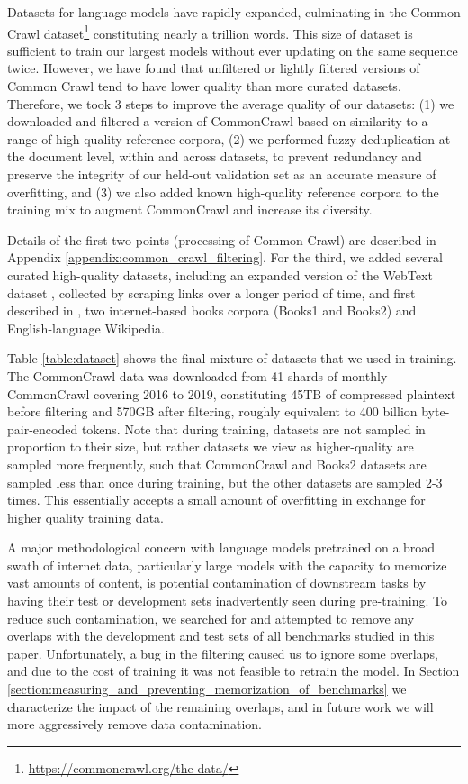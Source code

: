 Datasets for language models have rapidly expanded, culminating in the Common Crawl dataset\footnote{\url{https://commoncrawl.org/the-data/}} \cite{raffel2019t5} constituting nearly a trillion words.  This size of dataset is sufficient to train our largest models without ever updating on the same sequence twice. However, we have found that unfiltered or lightly filtered versions of Common Crawl tend to have lower quality than more curated datasets.  Therefore, we took 3 steps to improve the average quality of our datasets: (1) we downloaded and filtered a version of CommonCrawl based on similarity to a range of high-quality reference corpora, (2) we performed fuzzy deduplication at the document level, within and across datasets, to prevent redundancy and preserve the integrity of our held-out validation set as an accurate measure of overfitting, and (3) we also added known high-quality reference corpora to the training mix to augment CommonCrawl and increase its diversity.

Details of the first two points (processing of Common Crawl) are described in Appendix \ref{appendix:common_crawl_filtering}. For the third, we added several curated high-quality datasets, including an expanded version of the WebText dataset \cite{radford2019language}, collected by scraping links over a longer period of time, and first described in \cite{kaplan2020scaling}, two internet-based books corpora (Books1 and Books2) and English-language Wikipedia.


Table \ref{table:dataset} shows the final mixture of datasets that we used in training.  The CommonCrawl data was downloaded from 41 shards of monthly CommonCrawl covering 2016 to 2019, constituting 45TB of compressed plaintext before filtering and 570GB after filtering, roughly equivalent to 400 billion byte-pair-encoded tokens.    Note that during training, datasets are not sampled in proportion to their size, but rather datasets we view as higher-quality are sampled more frequently, such that CommonCrawl and Books2 datasets are sampled less than once during training, but the other datasets are sampled 2-3 times. This essentially accepts a small amount of overfitting in exchange for higher quality training data.



A major methodological concern with language models pretrained on a broad swath of internet data, particularly large models with the capacity to memorize vast amounts of content, is potential contamination of downstream tasks by having their test or development sets inadvertently seen during pre-training.  To reduce such contamination, we searched for and attempted to remove any overlaps with the development and test sets of all benchmarks studied in this paper.  Unfortunately, a bug in the filtering caused us to ignore some overlaps, and due to the cost of training it was not feasible to retrain the model. In Section \ref{section:measuring_and_preventing_memorization_of_benchmarks} we characterize the impact of the remaining overlaps, and in future work we will more aggressively remove data contamination. 